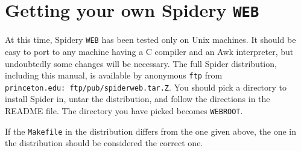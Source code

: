 \section{Getting your own  Spidery {\tt WEB}}
At this time, Spidery {\tt WEB} has been tested only on Unix machines.
It should be easy to port to any machine having a C compiler and an
Awk interpreter, but undoubtedly some changes will be necessary.
The full {Spider} distribution, including this manual, is available by
anonymous {\tt ftp} from {\tt princeton.edu:~ftp/pub/spiderweb.tar.Z}.
You should pick a directory to install {Spider} in, untar the
distribution, and follow the directions in the README file.
The directory you have picked becomes {\tt WEBROOT}.

If the {\tt Makefile} in the distribution differs from the one given
above, the one in the distribution should be considered the correct
one. 




